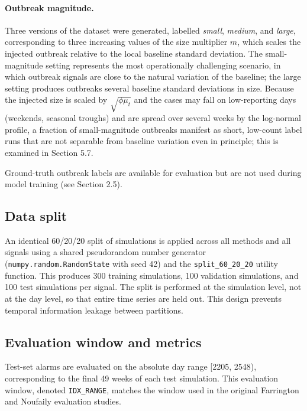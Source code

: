 \documentclass[11pt]{article}
\begin{document}
\paragraph{Outbreak magnitude.} Three versions of the dataset were generated, labelled \textit{small}, \textit{medium}, and \textit{large}, corresponding to three increasing values of the size multiplier $m$, which scales the injected outbreak relative to the local baseline standard deviation. The small-magnitude setting represents the most operationally challenging scenario, in which outbreak signals are close to the natural variation of the baseline; the large setting produces outbreaks several baseline standard deviations in size. Because the injected size is scaled by $\sqrt{\phi\mu_t}$ and the cases may fall on low-reporting days (weekends, seasonal troughs) and are spread over several weeks by the log-normal profile, a fraction of small-magnitude outbreaks manifest as short, low-count label runs that are not separable from baseline variation even in principle; this is examined in Section 5.7.

Ground-truth outbreak labels are available for evaluation but are not used during model training (see Section 2.5).

\subsection{Data split}

An identical 60/20/20 split of simulations is applied across all methods and all signals using a shared pseudorandom number generator (\texttt{numpy.random.RandomState} with seed 42) and the \texttt{split\_60\_20\_20} utility function. This produces 300 training simulations, 100 validation simulations, and 100 test simulations per signal. The split is performed at the simulation level, not at the day level, so that entire time series are held out. This design prevents temporal information leakage between partitions.

\subsection{Evaluation window and metrics}

Test-set alarms are evaluated on the absolute day range [2205, 2548), corresponding to the final 49 weeks of each test simulation. This evaluation window, denoted \texttt{IDX\_RANGE}, matches the window used in the original Farrington and Noufaily evaluation studies.
\end{document}
